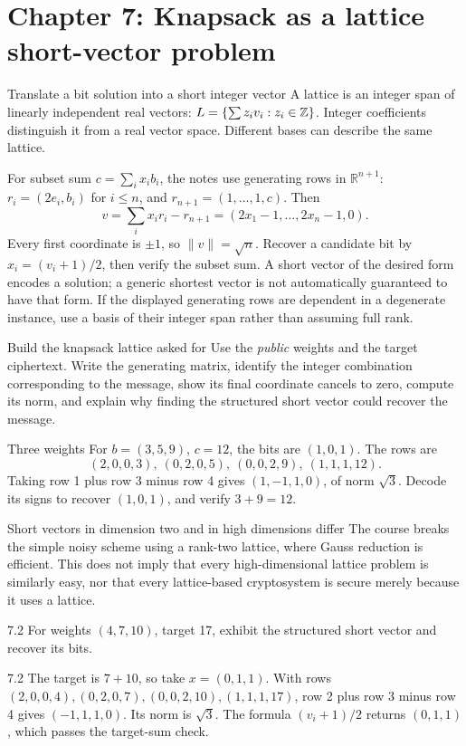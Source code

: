 \documentclass[11pt,a4paper]{article}
\newcommand{\R}{\mathbb R}\newcommand{\C}{\mathbb C}\newcommand{\lap}{\mathcal L}\newcommand{\Srat}{\mathcal S}\newcommand{\dd}{\,\mathrm d}\newcommand{\ii}{\mathrm i}\newcommand{\Rea}{\operatorname{Re}}\newcommand{\I}{I}
\begin{document}
\section{Chapter 7: Knapsack as a lattice short-vector problem}
\begin{concept}{Translate a bit solution into a short integer vector}
A lattice is an integer span of linearly independent real vectors: \(L=\{\sum z_iv_i:z_i\in\mathbb Z\}\). Integer coefficients distinguish it from a real vector space. Different bases can describe the same lattice.

For subset sum \(c=\sum_i x_i b_i\), the notes use generating rows in \(\R^{n+1}\): \(r_i=(2e_i,b_i)\) for \(i\le n\), and \(r_{n+1}=(1,\ldots,1,c)\). Then
\[v=\sum_i x_i r_i-r_{n+1}=(2x_1-1,\ldots,2x_n-1,0).\]
Every first coordinate is \(\pm1\), so \(\|v\|=\sqrt n\). Recover a candidate bit by \(x_i=(v_i+1)/2\), then verify the subset sum. A short vector of the desired form encodes a solution; a generic shortest vector is not automatically guaranteed to have that form. If the displayed generating rows are dependent in a degenerate instance, use a basis of their integer span rather than assuming full rank.
\end{concept}
\begin{method}{Build the knapsack lattice asked for}
Use the \emph{public} weights and the target ciphertext. Write the generating matrix, identify the integer combination corresponding to the message, show its final coordinate cancels to zero, compute its norm, and explain why finding the structured short vector could recover the message.
\end{method}
\begin{example}{Three weights}
For \(b=(3,5,9)\), \(c=12\), the bits are \((1,0,1)\). The rows are
\[(2,0,0,3),\ (0,2,0,5),\ (0,0,2,9),\ (1,1,1,12).\]
Taking row 1 plus row 3 minus row 4 gives \((1,-1,1,0)\), of norm \(\sqrt3\). Decode its signs to recover \((1,0,1)\), and verify \(3+9=12\).
\end{example}
\begin{tip}{Short vectors in dimension two and in high dimensions differ}
The course breaks the simple noisy scheme using a rank-two lattice, where Gauss reduction is efficient. This does not imply that every high-dimensional lattice problem is similarly easy, nor that every lattice-based cryptosystem is secure merely because it uses a lattice.
\end{tip}
\begin{question}{7.2}
For weights \((4,7,10)\), target 17, exhibit the structured short vector and recover its bits.
\end{question}
\begin{answer}{7.2}
The target is \(7+10\), so take \(x=(0,1,1)\). With rows \((2,0,0,4),(0,2,0,7),(0,0,2,10),(1,1,1,17)\), row 2 plus row 3 minus row 4 gives \((-1,1,1,0)\). Its norm is \(\sqrt3\). The formula \((v_i+1)/2\) returns \((0,1,1)\), which passes the target-sum check.
\end{answer}
\end{document}
